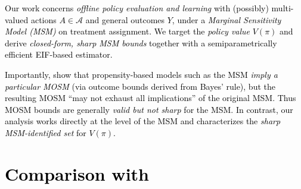\documentclass{article} %
\theoremstyle{plain}
\theoremstyle{definition}
\theoremstyle{remark}
\newcommand{\rebuttal}[1]{\textcolor{black}{#1}}
\begin{document}
\rebuttal{Our work concerns \emph{offline policy evaluation and learning} with (possibly) 
multi-valued actions $A\in\mathcal{A}$ and general outcomes $Y$, under a 
\emph{Marginal Sensitivity Model (MSM)} on treatment assignment. We target the 
\emph{policy value} $V(\pi)$ and derive \emph{closed-form, sharp MSM bounds} together 
with a semiparametrically efficient EIF-based estimator.}

\rebuttal{Importantly, \citet{Rambachan.2025} show that propensity-based models such as the MSM \emph{imply a particular MOSM} (via outcome bounds derived from Bayes' rule), but the 
resulting MOSM ``may not exhaust all implications'' of the original MSM. Thus MOSM bounds 
are generally \emph{valid but not sharp} for the MSM. In contrast, our analysis works 
directly at the level of the MSM and characterizes the \emph{sharp MSM-identified set} 
for $V(\pi)$.}

\clearpage


\section{\rebuttal{Comparison with \citet{Kallus.2018c,Kallus.2021d}}}
\label{appendix:kz_comparison}
\end{document}
